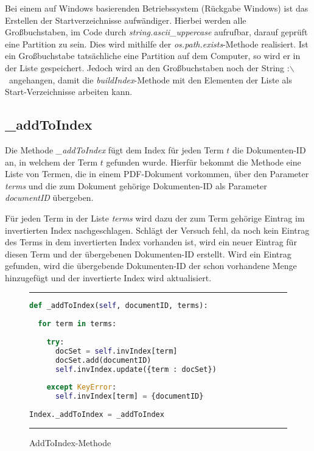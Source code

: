 Bei einem auf Windows basierenden Betriebssystem (Rückgabe \glqq Windows\grqq) ist das Erstellen der Startverzeichnisse aufwändiger. Hierbei werden alle Großbuchstaben, im Code durch \textit{string.ascii\_uppercase} aufrufbar, darauf geprüft eine Partition zu sein. Dies wird mithilfe der \textit{os.path.exists}-Methode realisiert. Ist ein Großbuchstabe tatsächliche eine Partition auf dem Computer, so wird er in der Liste gespeichert. Jedoch wird an den Großbuchstaben noch der String \glqq :$\backslash$\grqq\ angehangen, damit die \textit{buildIndex}-Methode mit den Elementen der Liste als Start-Verzeichnisse arbeiten kann.

\subsection{\_addToIndex}\label{addtoindex}

Die Methode \textit{\_addToIndex} fügt dem Index für jeden Term $t$ die Dokumenten-ID an, in welchem der Term $t$ gefunden wurde.  Hierfür bekommt die Methode eine Liste von Termen, die in einem PDF-Dokument vorkommen, über den Parameter \textit{terms} und die zum Dokument gehörige Dokumenten-ID als Parameter \textit{documentID} übergeben.

Für jeden Term in der Liste \emph{terms} wird dazu der zum Term gehörige Eintrag im invertierten Index nachgeschlagen. Schlägt der Versuch fehl, da noch kein Eintrag des Terms in dem invertierten Index vorhanden ist, wird ein neuer Eintrag für diesen Term und der übergebenen Dokumenten-ID erstellt. Wird ein Eintrag gefunden, wird die übergebende Dokumenten-ID der schon vorhandene Menge hinzugefügt und der invertierte Index wird aktualisiert.

\begin{figure}
	\rule{\textwidth}{0.4pt}
		\begin{lstlisting}[language=Python]
def _addToIndex(self, documentID, terms):
    
  for term in terms:
        
    try:
      docSet = self.invIndex[term]
      docSet.add(documentID)
      self.invIndex.update({term : docSet})
            
    except KeyError:
      self.invIndex[term] = {documentID}
    
Index._addToIndex = _addToIndex
		\end{lstlisting}
	\rule{\textwidth}{0.4pt}
	\caption{AddToIndex-Methode}
	\label{fig:addToIndex}
\end{figure}



